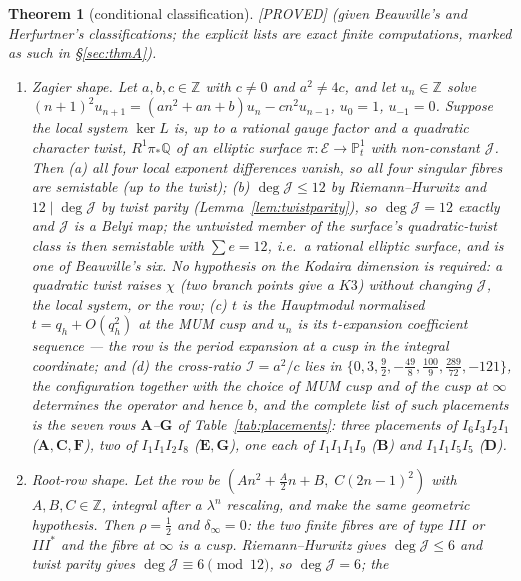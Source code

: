 \documentclass[11pt,reqno]{amsart}
\theoremstyle{plain}
\theoremstyle{definition}
\theoremstyle{remark}
\theoremstyle{plain}
\newtheorem{namedthm}{Theorem}
\newcommand{\Z}{\mathbb{Z}}
\newcommand{\Q}{\mathbb{Q}}
\newcommand{\PP}{\mathbb{P}}
\newcommand{\Proved}{\textup{\textsf{[PROVED]}}}
\begin{document}
\begin{namedthm}[conditional classification]\label{thmA}
\Proved{} \textup{(}given Beauville's and Herfurtner's classifications; the
explicit lists are exact finite computations, marked as such in
\S\ref{sec:thmA}\textup{)}.
\begin{enumerate}[label=\textup{(\arabic*)},leftmargin=2.6em]
\item \emph{Zagier shape.} Let $a,b,c\in\Z$ with $c\ne0$ and $a^2\ne4c$, and let
$u_n\in\Z$ solve $(n+1)^2u_{n+1}=(an^2+an+b)u_n-cn^2u_{n-1}$, $u_0=1$,
$u_{-1}=0$. Suppose the local system $\ker L$ is, up to a rational gauge factor
and a quadratic character twist, $R^1\pi_*\Q$ of an elliptic surface
$\pi:\mathcal E\to\PP^1_t$ with non-constant $\mathcal J$. Then \emph{(a)} all
four local exponent differences vanish, so all four singular fibres are
semistable (up to the twist); \emph{(b)} $\deg\mathcal J\le12$ by
Riemann--Hurwitz and $12\mid\deg\mathcal J$ by twist parity
(Lemma~\ref{lem:twistparity}), so $\deg\mathcal J=12$ exactly and $\mathcal J$ is
a Belyi map; the \emph{untwisted} member of the surface's quadratic-twist class
is then semistable with $\sum e=12$, i.e.\ a \emph{rational} elliptic surface,
and is one of Beauville's six. No hypothesis on the Kodaira dimension is
required: a quadratic twist raises $\chi$ (two branch points give a $K3$) without
changing $\mathcal J$, the local system, or the row; \emph{(c)} $t$ is the Hauptmodul
normalised $t=q_h+O(q_h^2)$ at the MUM cusp and $u_n$ is its $t$-expansion
coefficient sequence --- the row is the period expansion at a cusp in the integral
coordinate; and \emph{(d)} the cross-ratio $\mathcal I=a^2/c$ lies in
$\{0,3,\tfrac92,-\tfrac{49}8,\tfrac{100}9,\tfrac{289}{72},-121\}$, the
configuration together with the choice of MUM cusp and of the cusp at $\infty$
determines the operator and hence $b$, and the complete list of such placements
is the seven rows $\mathbf A$--$\mathbf G$ of Table~\ref{tab:placements}: three
placements of $I_6I_3I_2I_1$ ($\mathbf A,\mathbf C,\mathbf F$), two of
$I_1I_1I_2I_8$ ($\mathbf E,\mathbf G$), one each of $I_1I_1I_1I_9$
($\mathbf B$) and $I_1I_1I_5I_5$ ($\mathbf D$).
\item \emph{Root-row shape.} Let the row be
$(An^2+\tfrac A2n+B,\;C(2n-1)^2)$ with $A,B,C\in\Z$, integral after a $\lambda^n$
rescaling, and make the same geometric hypothesis. Then $\rho=\tfrac12$ and
$\delta_\infty=0$: the two finite fibres are of type $III$ or $III^*$ and the
fibre at $\infty$ is a cusp. Riemann--Hurwitz gives $\deg\mathcal J\le6$ and
twist parity gives $\deg\mathcal J\equiv6\pmod{12}$, so $\deg\mathcal J=6$; the

\end{enumerate}
\end{namedthm}
\end{document}
